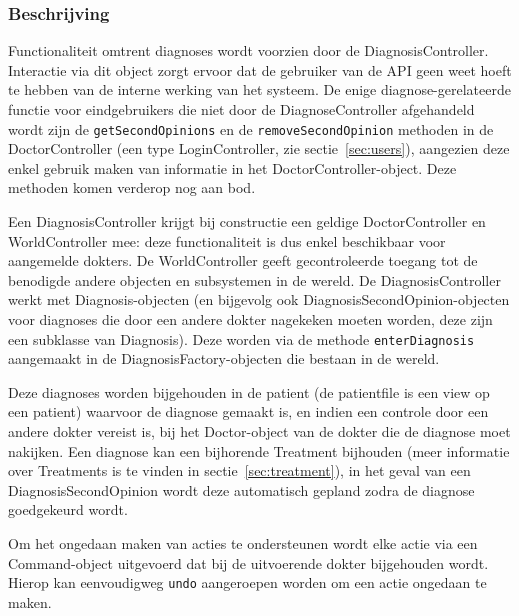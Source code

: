 \documentclass[a4paper]{article}
\begin{document}
\subsubsection{Beschrijving}
Functionaliteit omtrent diagnoses wordt voorzien door de DiagnosisController. Interactie via dit object zorgt ervoor dat de gebruiker van de API geen weet hoeft te hebben van de interne werking van het systeem. De enige diagnose-gerelateerde functie voor eindgebruikers die niet door de DiagnoseController afgehandeld wordt zijn de \texttt{getSecondOpinions} en de \texttt{removeSecondOpinion} methoden in de DoctorController (een type LoginController, zie sectie~\ref{sec:users}), aangezien deze enkel gebruik maken van informatie in het DoctorController-object. Deze methoden komen verderop nog aan bod.

Een DiagnosisController krijgt bij constructie een geldige DoctorController en WorldController mee: deze functionaliteit is dus enkel beschikbaar voor aangemelde dokters. De WorldController geeft gecontroleerde toegang tot de benodigde andere objecten en subsystemen in de wereld.
De DiagnosisController werkt met Diagnosis-objecten (en bijgevolg ook DiagnosisSecondOpinion-objecten voor diagnoses die door een andere dokter nagekeken moeten worden, deze zijn een subklasse van Diagnosis). Deze worden  via de methode \texttt{enterDiagnosis} aangemaakt in de DiagnosisFactory-objecten die bestaan in de wereld.

Deze diagnoses worden bijgehouden in de patient (de patientfile is een view op een patient) waarvoor de diagnose gemaakt is, en indien een controle door een andere dokter vereist is, bij het Doctor-object van de dokter die de diagnose moet nakijken.
Een diagnose kan een bijhorende Treatment bijhouden (meer informatie over Treatments is te vinden in sectie~\ref{sec:treatment}), in het geval van een DiagnosisSecondOpinion wordt deze automatisch gepland zodra de diagnose goedgekeurd wordt.

Om het ongedaan maken van acties te ondersteunen wordt elke actie via een Command-object uitgevoerd dat bij de uitvoerende dokter bijgehouden wordt. Hierop kan eenvoudigweg \texttt{undo} aangeroepen worden om een actie ongedaan te maken.
\end{document}
